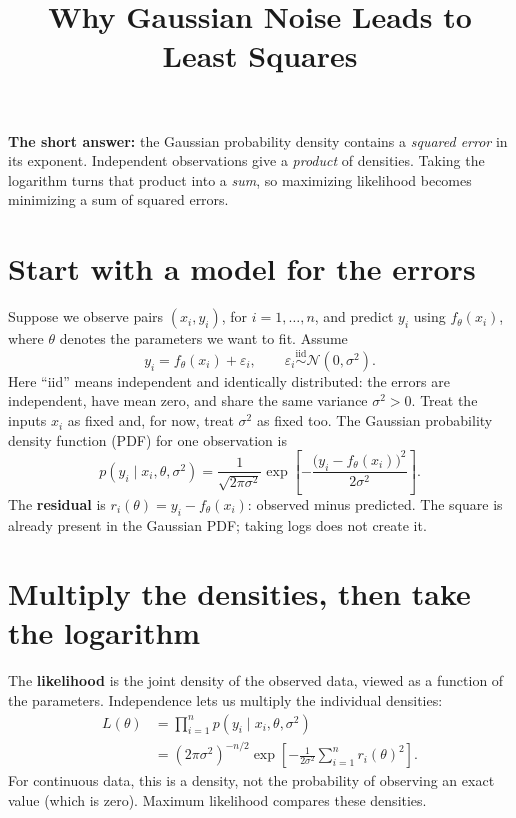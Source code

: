 \documentclass[11pt,a4paper]{article}
\title{Why Gaussian Noise Leads to Least Squares}
\author{}
\date{}
\begin{document}
\maketitle
\vspace{-2em}

\textbf{The short answer:} the Gaussian probability density contains a
\emph{squared error} in its exponent. Independent observations give a
\emph{product} of densities. Taking the logarithm turns that product into a
\emph{sum}, so maximizing likelihood becomes minimizing a sum of squared errors.

\section{Start with a model for the errors}

Suppose we observe pairs $(x_i,y_i)$, for $i=1,\ldots,n$, and predict $y_i$ using
$f_\theta(x_i)$, where $\theta$ denotes the parameters we want to fit. Assume
\[
    y_i=f_\theta(x_i)+\varepsilon_i,
    \qquad \varepsilon_i\overset{\mathrm{iid}}{\sim}\mathcal{N}(0,\sigma^2).
\]
Here ``iid'' means independent and identically distributed: the errors are
independent, have mean zero, and share the same variance $\sigma^2>0$.
Treat the inputs $x_i$ as fixed and, for now, treat $\sigma^2$ as fixed too.
The Gaussian probability density function (PDF) for one observation is
\begin{equation}
    p(y_i\mid x_i,\theta,\sigma^2)
    =\frac{1}{\sqrt{2\pi\sigma^2}}
      \exp\!\left[-\frac{\bigl(y_i-f_\theta(x_i)\bigr)^2}{2\sigma^2}\right].
\end{equation}
The \textbf{residual} is $r_i(\theta)=y_i-f_\theta(x_i)$: observed minus predicted.
The square is already present in the Gaussian PDF; taking logs does not create it.

\section{Multiply the densities, then take the logarithm}

The \textbf{likelihood} is the joint density of the observed data, viewed as a
function of the parameters. Independence lets us multiply the individual densities:
\begin{align}
    L(\theta)
    &=\prod_{i=1}^{n}p(y_i\mid x_i,\theta,\sigma^2)\\
    &=(2\pi\sigma^2)^{-n/2}
      \exp\!\left[-\frac{1}{2\sigma^2}
                    \sum_{i=1}^{n}r_i(\theta)^2\right].
\end{align}
For continuous data, this is a density, not the probability of observing an
exact value (which is zero). Maximum likelihood compares these densities.
\end{document}
